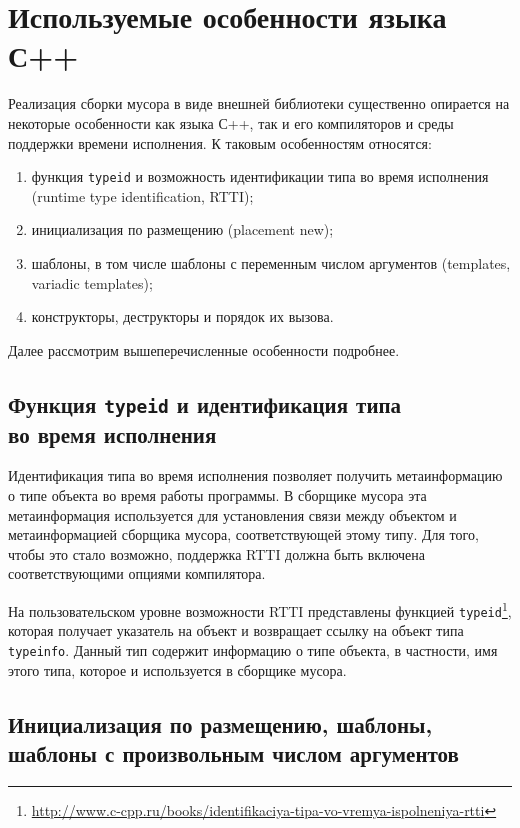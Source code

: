 \section{Используемые особенности языка С++}

Реализация сборки мусора в виде внешней библиотеки существенно опирается 
на некоторые особенности как языка С++, так и его компиляторов и среды поддержки времени 
исполнения. К таковым особенностям относятся:

\begin{enumerate}
\item функция \lstinline{typeid} и возможность идентификации типа во время исполнения (runtime type identification, RTTI);
\item инициализация по размещению (placement new);
\item шаблоны, в том числе шаблоны с переменным числом аргументов (templates, variadic templates);
\item конструкторы, деструкторы и порядок их вызова.
\end{enumerate}

Далее рассмотрим вышеперечисленные особенности подробнее.

\subsection{Функция \lstinline{typeid} и идентификация типа\\
во время исполнения} 

Идентификация типа во время исполнения позволяет получить метаинформацию о типе объекта во время работы программы. 
В сборщике мусора эта метаинформация используется для установления связи между объектом и метаинформацией сборщика
мусора, соответствующей этому типу. Для того, чтобы это стало возможно, поддержка RTTI должна быть включена 
соответствующими опциями компилятора.

На пользовательском уровне возможности RTTI представлены функцией \lstinline{typeid}\footnote{\url{http://www.c-cpp.ru/books/identifikaciya-tipa-vo-vremya-ispolneniya-rtti}},
которая получает указатель на объект и возвращает ссылку на объект типа \lstinline{typeinfo}. Данный тип
содержит информацию о типе объекта, в частности, имя этого типа, которое и используется в сборщике мусора.

\subsection{Инициализация по размещению, шаблоны,\\
шаблоны с произвольным числом аргументов} 

